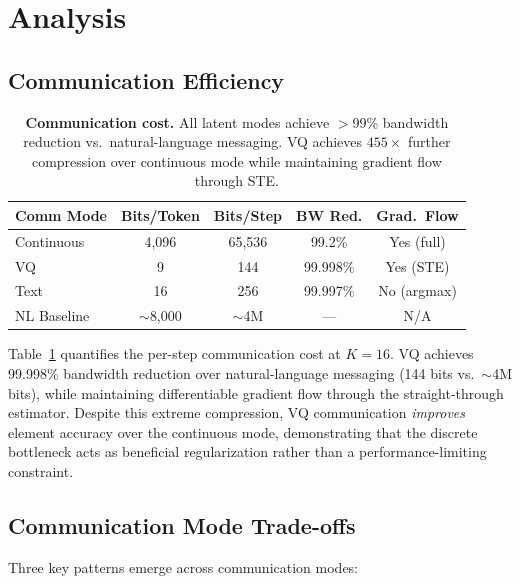 \documentclass{article}
\begin{document}
\section{Analysis}
\label{sec:analysis}

\subsection{Communication Efficiency}

\begin{table}[t]
\centering
\caption{\textbf{Communication cost.}  All latent modes achieve $>$99\% bandwidth reduction vs.\ natural-language messaging.  VQ achieves $455\times$ further compression over continuous mode while maintaining gradient flow through STE.}
\label{tab:comm_cost}
\small
\begin{tabular}{lcccc}
\toprule
\textbf{Comm Mode} & \textbf{Bits/Token} & \textbf{Bits/Step} & \textbf{BW Red.} & \textbf{Grad.\ Flow} \\
\midrule
Continuous & 4,096 & 65,536 & 99.2\% & Yes (full) \\
VQ & 9 & 144 & 99.998\% & Yes (STE) \\
Text & 16 & 256 & 99.997\% & No (argmax) \\
\midrule
NL Baseline & ${\sim}$8,000 & ${\sim}$4M & --- & N/A \\
\bottomrule
\end{tabular}
\end{table}

Table~\ref{tab:comm_cost} quantifies the per-step communication cost at $K{=}16$.  VQ achieves 99.998\% bandwidth reduction over natural-language messaging (144 bits vs.\ ${\sim}$4M bits), while maintaining differentiable gradient flow through the straight-through estimator.  Despite this extreme compression, VQ communication \emph{improves} element accuracy over the continuous mode, demonstrating that the discrete bottleneck acts as beneficial regularization rather than a performance-limiting constraint.

\subsection{Communication Mode Trade-offs}
\label{sec:mode_analysis}

Three key patterns emerge across communication modes:
\end{document}

